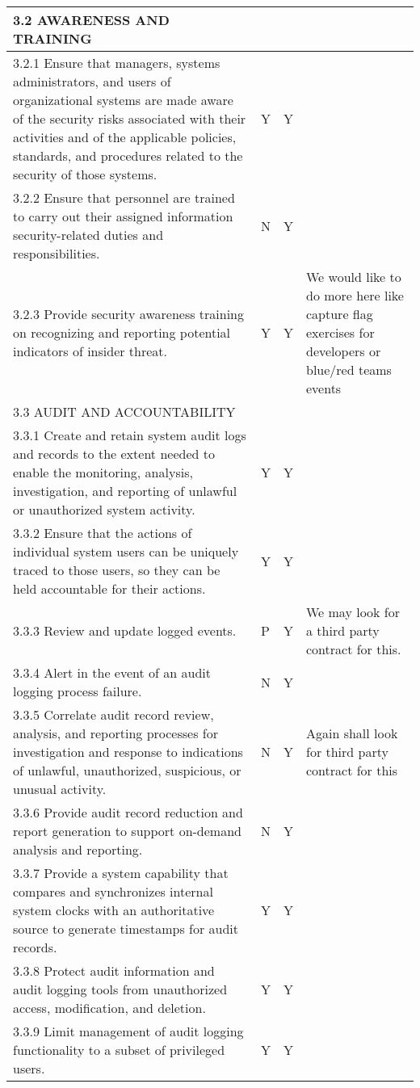 \begin{longtable} {|p{}|p{}|p{}|p{} |}
{3.2 AWARENESS AND TRAINING}&&& \\ \hline
{3.2.1 Ensure that managers, systems administrators, and users of organizational systems are made aware of the security risks associated with their activities and of the applicable policies, standards, and procedures related to the security of those systems.}&{Y}&{Y}& \\ \hline
{3.2.2 Ensure that personnel are trained to carry out their assigned information security-related duties and responsibilities.}&{N}&{Y}& \\ \hline
{3.2.3 Provide security awareness training on recognizing and reporting potential indicators of insider threat.}&{Y}&{Y}&{We would like to do more here like capture flag exercises for developers or blue/red teams events} \\ \hline
{3.3 AUDIT AND ACCOUNTABILITY}&&& \\ \hline
{3.3.1 Create and retain system audit logs and records to the extent needed to enable the monitoring, analysis, investigation, and reporting of unlawful or unauthorized system activity.}&{Y}&{Y}& \\ \hline
{3.3.2 Ensure that the actions of individual system users can be uniquely traced to those users, so they can be held accountable for their actions.}&{Y}&{Y}& \\ \hline
{3.3.3 Review and update logged events.}&{P}&{Y}&{We may look for a third party contract for this.} \\ \hline
{3.3.4 Alert in the event of an audit logging process failure.}&{N}&{Y}& \\ \hline
{3.3.5 Correlate audit record review, analysis, and reporting processes for investigation and response to indications of unlawful, unauthorized, suspicious, or unusual activity.}&{N}&{Y}&{Again shall look for third party contract for this} \\ \hline
{3.3.6 Provide audit record reduction and report generation to support on-demand analysis and reporting.}&{N}&{Y}& \\ \hline
{3.3.7 Provide a system capability that compares and synchronizes internal system clocks with an authoritative source to generate timestamps for audit records.}&{Y}&{Y}& \\ \hline
{3.3.8 Protect audit information and audit logging tools from unauthorized access, modification, and deletion.}&{Y}&{Y}& \\ \hline
{3.3.9 Limit management of audit logging functionality to a subset of privileged users.}&{Y}&{Y}& \\ \hline

\end{longtable}
